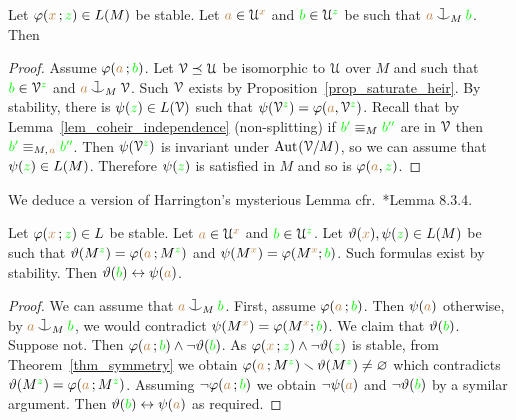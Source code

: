 
\begin{theorem}[ (Symmetry)]\label{thm_symmetry}
  Let $\varphi({\color{brown} x}\,;{\color{green} z})\in L(M)$ be stable.
  Let ${\color{brown} a}\in\EuScript U^{\color{brown} x}$ and ${\color{green} b}\in\EuScript U^{\color{green} z}$ be such that ${\mr a}\cnonfork_M{\gr b}$.
  Then

\end{theorem}

\vspace*{-\parskip}
\begin{proof}
  Assume $\varphi({\color{brown} a}\,;{\color{green} b})$.
  Let $\EuScript V\preceq\EuScript U$ be isomorphic to $\EuScript U$ over $M$ and such that ${\color{green} b}\in\EuScript V^{\color{green} z}$ and ${\mr a}\cnonfork_M\V$. Such $\EuScript V$ exists by Proposition~\ref{prop_saturate_heir}.
  By stability, there is $\psi({\color{green} z})\in L(\EuScript V)$ such that $\psi(\EuScript V^{\color{green} z})=\varphi({\color{brown} a},\EuScript V^{\color{green} z})$.
  Recall that by Lemma~\ref{lem_coheir_independence} (non-splitting) if ${\color{green} b'}\equiv_M{\color{green} b''}$ are in $\EuScript V$ then ${\color{green} b'}\equiv_{M,\kern.2ex{\color{brown} a}}{\color{green} b''}$.
  Then $\psi(\EuScript V^{\color{green} z})$ is invariant under ${\rm Aut\kern.15ex}(\EuScript V/M)$, so we can assume that $\psi({\color{green} z})\in L(M)$.
  Therefore $\psi({\color{green} z})$ is satisfied in $M$ and so is $\varphi({\color{brown} a},{\color{green} z})$.
\end{proof}

We deduce a version of Harrington's mysterious Lemma cfr.~\cite{TZ}*{Lemma 8.3.4}.

\begin{corollary}\label{corol_harrington0}
  Let $\varphi({\color{brown} x}\,;{\color{green} z})\in L$ be stable.
  Let ${\color{brown} a}\in\EuScript U^{\color{brown} x}$ and ${\color{green} b}\in\EuScript U^{\color{green} z}$.
  Let $\vartheta({\color{brown} x}),\psi({\color{green} z})\in L(M)$ be such that $\vartheta(M^{\color{green} z})=\varphi({\color{brown} a}\,;M^{\color{green} z})$ and $\psi(M^{\color{brown} x})=\varphi(M^{\color{brown} x};{\color{green} b})$.
  Such formulas exist by stability.
  Then $\vartheta({\color{green} b})\leftrightarrow\psi({\color{brown} a})$.
\end{corollary}

\begin{proof}
  We can assume that ${\mr a}\cnonfork_M{\gr b}$.
  First, assume $\varphi({\color{brown} a}\,;{\color{green} b})$.
  Then $\psi({\color{brown} a})$ otherwise, by ${\mr a}\cnonfork_M{\gr b}$, we would contradict $\psi(M^{\color{brown} x})=\varphi(M^{\color{brown} x};{\color{green} b})$.
  We claim that $\vartheta({\color{green} b})$.
  Suppose not.
  Then $\varphi({\color{brown} a}\,;{\color{green} b})\wedge\neg\vartheta({\color{green} b})$.
  As $\varphi({\color{brown} x}\,;{\color{green} z})\wedge\neg\vartheta({\color{green} z})$ is stable, from Theorem~\ref{thm_symmetry} we obtain $\varphi({\color{brown} a}\,;M^{\color{green} z})\smallsetminus\vartheta(M^{\color{green} z})\neq\varnothing$ which contradicts  $\vartheta(M^{\color{green} z})=\varphi({\color{brown} a}\,;M^{\color{green} z})$.
  Assuming $\neg\varphi({\color{brown} a}\,;{\color{green} b})$ we obtain $\neg\psi({\color{brown} a})$ and $\neg\vartheta({\color{green} b})$ by a symilar argument.
  Then $\vartheta({\color{green} b})\leftrightarrow\psi({\color{brown} a})$ as required.
\end{proof}

